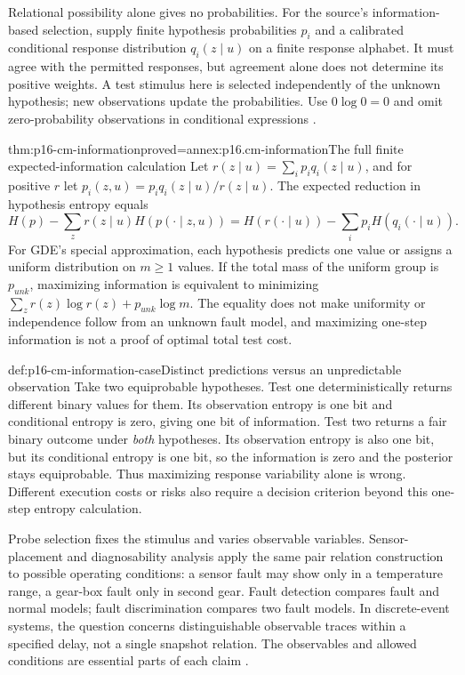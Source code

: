 Relational possibility alone gives no probabilities. For the source's
information-based selection, supply finite hypothesis probabilities \(p_i\)
and a calibrated conditional response distribution \(q_i(z\mid u)\)
on a finite response alphabet.
It must agree with the permitted responses, but agreement alone does not
determine its positive weights. A test stimulus here is selected independently
of the unknown hypothesis; new observations update the probabilities.
Use \(0\log 0=0\) and omit zero-probability observations in conditional
expressions \cite[secs.~10.5.2--10.5.3]{Struss2008ModelBasedProblemSolving}.

\begin{hbtheorem}{thm:p16-cm-information}{proved=annex:p16.cm-information}{The full finite expected-information calculation}
Let \(r(z\mid u)=\sum_i p_iq_i(z\mid u)\), and for positive \(r\)
let \(p_i(z,u)=p_iq_i(z\mid u)/r(z\mid u)\). The expected reduction
in hypothesis entropy equals
\[
 H(p)-\sum_z r(z\mid u)H(p(\cdot\mid z,u))
   =H(r(\cdot\mid u))-\sum_i p_iH(q_i(\cdot\mid u)).
\]
For GDE's special approximation, each hypothesis predicts one value or
assigns a uniform distribution on \(m\ge1\) values. If the total mass of the
uniform group is \(p_{unk}\), maximizing information is equivalent to
minimizing \(\sum_z r(z)\log r(z)+p_{unk}\log m\).
The equality does not make uniformity or independence follow from an unknown
fault model, and maximizing one-step information is not a proof of optimal
total test cost.
\end{hbtheorem}

\begin{hbexample}{def:p16-cm-information-case}{Distinct predictions versus an unpredictable observation}
Take two equiprobable hypotheses. Test one deterministically returns
different binary values for them. Its observation entropy is one bit and
conditional entropy is zero, giving one bit of information. Test two
returns a fair binary outcome under \emph{both} hypotheses. Its observation
entropy is also one bit, but its conditional entropy is one bit, so the
information is zero and the posterior stays equiprobable. Thus maximizing
response variability alone is wrong. Different execution costs or risks
also require a decision criterion beyond this one-step entropy calculation.
\end{hbexample}

Probe selection fixes the stimulus and varies observable variables.
Sensor-placement and diagnosability analysis apply the same pair relation
construction to possible operating conditions: a sensor fault may show only
in a temperature range, a gear-box fault only in second gear. Fault detection
compares fault and normal models; fault discrimination compares two fault
models. In discrete-event systems, the question concerns distinguishable
observable traces within a specified delay, not a single snapshot relation.
The observables and allowed conditions are essential parts of each claim
\cite[sec.~10.5.4]{Struss2008ModelBasedProblemSolving}.

